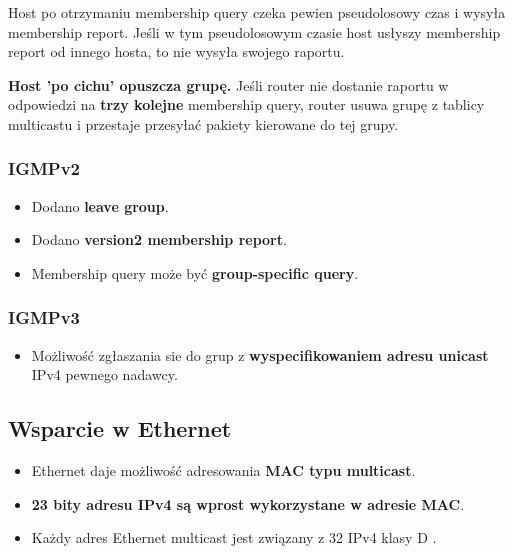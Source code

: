 \documentclass[../sk-egzamin.tex]{subfiles}
\begin{document}
Host po otrzymaniu membership query czeka pewien pseudolosowy czas i wysyła
membership report.
Jeśli w tym pseudolosowym czasie host usłyszy membership report od innego
hosta, to nie wysyła swojego raportu.

\textbf{Host 'po cichu' opuszcza grupę.}
Jeśli router nie dostanie raportu w odpowiedzi na \textbf{trzy kolejne}
membership query, router usuwa grupę z tablicy multicastu i przestaje
przesyłać pakiety kierowane do tej grupy.

\subsubsection*{IGMPv2}
\begin{itemize}
    \item Dodano \textbf{leave group}.
    \item Dodano \textbf{version2 membership report}.
    \item Membership query może być \textbf{group-specific query}.
\end{itemize}

\subsubsection*{IGMPv3}
\begin{itemize}
    \item Możliwość zgłaszania sie do grup z \textbf{wyspecifikowaniem
    adresu unicast} IPv4 pewnego nadawcy.
\end{itemize}

\subsection*{Wsparcie w Ethernet}
\begin{itemize}
    \item Ethernet daje możliwość adresowania \textbf{MAC typu multicast}.

    \item \textbf{23 bity adresu IPv4 są wprost wykorzystane w adresie MAC}.

    \item Każdy adres Ethernet multicast jest związany z 32 IPv4 klasy D
    .
\end{itemize}

\pagebreak
\end{document}
